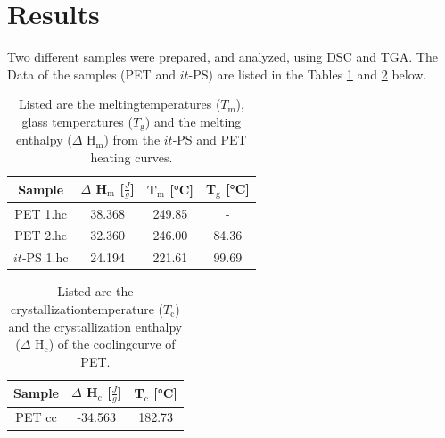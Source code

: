 \documentclass[10pt,a4paper,ngerman]{scrartcl}
\begin{document}
\section{Results}

    Two different samples were prepared, and analyzed, using DSC and TGA. 
    The Data of the samples (PET and $it$-PS) are listed in the Tables \ref{Messwertehc} and \ref{Messwertecc} below.

    \begin{table}[H]
    \begin{center}
        \caption{Listed are the meltingtemperatures ($T_\text{m}$), glass temperatures ($T_\text{g}$) and the melting enthalpy ($\Delta$ H$_\text{m}$) from the $it$-PS and PET heating curves.}
        \label{Messwertehc}
            \begin{tabular}{c|c|c|c}
                \hline
                Sample & $\Delta$ H$_\text{m}$ [$\frac{J}{g}$] & T$_\text{m}$ [°C] & T$_\text{g}$ [°C]\\
                \hline  
                PET 1.hc & 38.368 & 249.85 & - \\
                PET 2.hc & 32.360 & 246.00 & 84.36 \\
                $it$-PS 1.hc & 24.194 & 221.61 & 99.69 \\
            \end{tabular}
    \end{center}
    \end{table}

    \begin{table}[H]
    \begin{center}
        \caption{Listed are the crystallizationtemperature ($T_\text{c}$) and the crystallization enthalpy ($\Delta$ H$_\text{c}$) of the coolingcurve of PET.}
        \label{Messwertecc}
            \begin{tabular}{c|c|c}
                \hline
                Sample & $\Delta$ H$_\text{c}$ [$\frac{J}{g}$] & T$_\text{c}$ [°C]\\
                \hline  
                PET cc & -34.563 & 182.73 \\
            \end{tabular}
    \end{center}
    \end{table}
\end{document}
